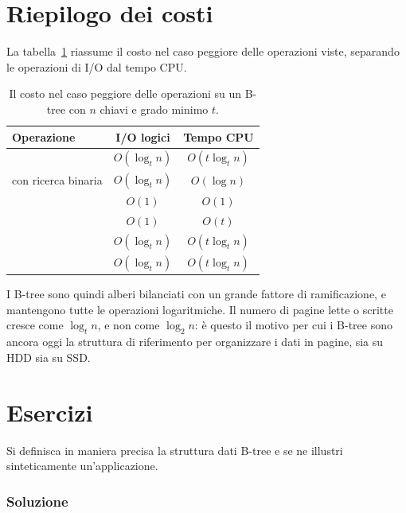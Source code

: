 \section{Riepilogo dei costi}\label{sec:btree-costi}
La tabella~\ref{tab:btree-costi} riassume il costo nel caso peggiore delle operazioni viste, separando le operazioni di I/O dal tempo CPU.

\begin{table}[htbp]
\centering
\small
\begin{tabular}{lcc}
\toprule
Operazione & I/O logici & Tempo CPU \\
\midrule
\BTreeSearch{} & $O(\log_t n)$ & $O(t\log_t n)$ \\
\BTreeSearch{} con ricerca binaria & $O(\log_t n)$ & $O(\log n)$ \\
\BTreeCreate{} & $O(1)$ & $O(1)$ \\
\BTreeSplitChild{} & $O(1)$ & $O(t)$ \\
\BTreeInsert{} & $O(\log_t n)$ & $O(t\log_t n)$ \\
\BTreeDelete{} & $O(\log_t n)$ & $O(t\log_t n)$ \\
\bottomrule
\end{tabular}
\caption{Il costo nel caso peggiore delle operazioni su un B-tree con $n$ chiavi e grado minimo $t$.}
\label{tab:btree-costi}
\end{table}

I B-tree sono quindi alberi bilanciati con un grande fattore di ramificazione, e mantengono tutte le operazioni logaritmiche. Il numero di pagine lette o scritte cresce come $\log_t n$, e non come $\log_2 n$: è questo il motivo per cui i B-tree sono ancora oggi la struttura di riferimento per organizzare i dati in pagine, sia su HDD sia su SSD.

\section{Esercizi}\label{sec:btree-esercizi}

\begin{esercizio}\label{es:btree-definizione}
Si definisca in maniera precisa la struttura dati B-tree e se ne illustri sinteticamente un'applicazione.
\end{esercizio}

\subsubsection*{Soluzione}

